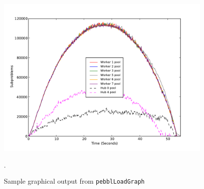 \begin{figure}[t]
\begin{center}
\vspace{-0.3in}
\includegraphics[width=0.95\textwidth]{sample-load-graph}
\vspace{-0.45in}
\end{center}
\caption{Sample graphical output from \texttt{pebblLoadGraph}}.
\label{fig:loadGraph}
\end{figure}
